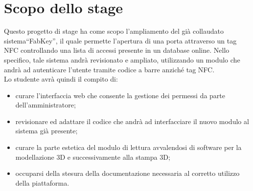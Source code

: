 \section*{Scopo dello stage}
Questo progetto di stage ha come scopo l'ampliamento del già collaudato sistema``FabKey'', il quale permette l'apertura di una porta attraverso un tag NFC controllando una lista di accessi presente in un database online. 
Nello specifico, tale sistema andrà revisionato e ampliato, utilizzando un modulo che andrà ad autenticare l'utente tramite codice a barre anziché tag NFC.\\
Lo studente avrà quindi il compito di:
\begin{itemize}
	\item curare l'interfaccia web che consente la gestione dei permessi da parte dell'amministratore;
	\item revisionare ed adattare il codice che andrà ad interfacciare il nuovo modulo al sistema già presente;
	\item curare la parte estetica del modulo di lettura avvalendosi di software per la modellazione 3D e successivamente alla stampa 3D;
	\item occuparsi della stesura della documentazione necessaria al corretto utilizzo della piattaforma.
\end{itemize}

